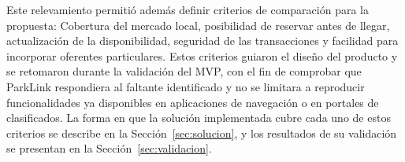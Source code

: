 Este relevamiento permitió además definir criterios de comparación para la propuesta: Cobertura del mercado local, posibilidad de reservar antes de llegar, actualización de la disponibilidad, seguridad de las transacciones y facilidad para incorporar oferentes particulares. Estos criterios guiaron el diseño del producto y se retomaron durante la validación del MVP, con el fin de comprobar que ParkLink respondiera al faltante identificado y no se limitara a reproducir funcionalidades ya disponibles en aplicaciones de navegación o en portales de clasificados. La forma en que la solución implementada cubre cada uno de estos criterios se describe en la Sección~\ref{sec:solucion}, y los resultados de su validación se presentan en la Sección~\ref{sec:validacion}.
